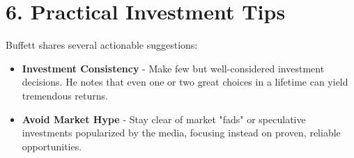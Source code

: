 \documentclass{article}
\begin{document}
\section*{6. Practical Investment Tips}
Buffett shares several actionable suggestions:

\begin{itemize}
    \item \textbf{Investment Consistency} - Make few but well-considered investment decisions. He notes that even one or two great choices in a lifetime can yield tremendous returns.
    \item \textbf{Avoid Market Hype} - Stay clear of market "fads" or speculative investments popularized by the media, focusing instead on proven, reliable opportunities.
\end{itemize}
\end{document}
